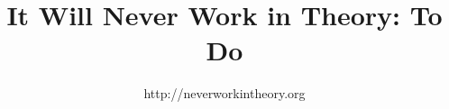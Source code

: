\documentclass[10pt]{article}
\title{It Will Never Work in Theory: To Do}
\author{http://neverworkintheory.org}
\begin{document}
\maketitle
\nocite{*}


\end{document}
